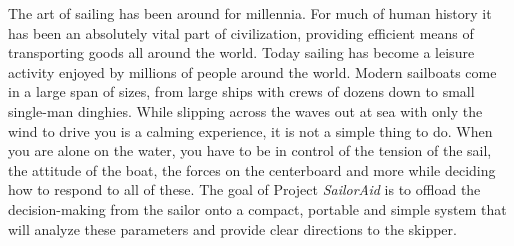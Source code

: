 
The art of sailing has been around for millennia. For much of human history it has been an absolutely vital part of civilization, providing efficient means of transporting goods all around the world. Today sailing has become a leisure activity enjoyed by millions of people around the world. Modern sailboats come in a large span of sizes, from large ships with crews of dozens down to small single-man dinghies. While slipping across the waves out at sea with only the wind to drive you is a calming experience, it is not a simple thing to do. When you are alone on the water, you have to be in control of the tension of the sail, the attitude of the boat, the forces on the centerboard and more while deciding how to respond to all of these. The goal of Project \emph{SailorAid} is to offload the decision-making from the sailor onto a compact, portable and simple system that will analyze these parameters and provide clear directions to the \gls{skipper}. 

